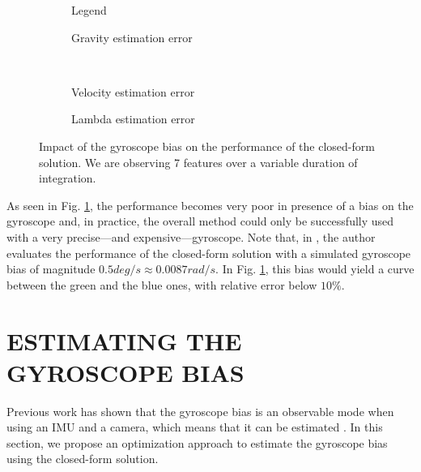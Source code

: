 \documentclass[letterpaper, 10 pt, journal, twoside]{IEEEtran}  %
\begin{document}
\begin{figure}
  \centering
        \hspace{0.2\columnwidth}%
        \begin{subfigure}[b]{0.3\columnwidth}
                \resizebox{\columnwidth}{!}{}
                \caption{Legend}

        \end{subfigure}%
        \begin{subfigure}[b]{0.5\columnwidth}
                \resizebox{\columnwidth}{!}{}
                \caption{Gravity estimation error}

        \end{subfigure}
        ~
        \begin{subfigure}[b]{0.5\columnwidth}
                \resizebox{\columnwidth}{!}{}
                \caption{Velocity estimation error}

        \end{subfigure}%
        \begin{subfigure}[b]{0.5\columnwidth}
                \resizebox{\columnwidth}{!}{}
                \caption{Lambda estimation error}

        \end{subfigure}
        \caption{Impact of the gyroscope bias on the performance of the closed-form solution. We are observing 7 features over a variable duration of integration. \label{fig:biasGyroCF}}
\end{figure}

As seen in Fig. \ref{fig:biasGyroCF}, the performance becomes very poor in presence of a bias on the gyroscope and, in practice, the overall method could only be successfully used with a very precise---and expensive---gyroscope.
Note that, in \cite{Martinelli2014}, the author evaluates the performance of the closed-form solution with a simulated gyroscope bias of magnitude $0.5deg/s \approx 0.0087 rad/s$.
In Fig. \ref{fig:biasGyroCF}, this bias would yield a curve between the green and the blue ones, with relative error below $10\%$.



\section{ESTIMATING THE GYROSCOPE BIAS}\label{SectionCalibration}

Previous work has shown that the gyroscope bias is an observable mode when using an IMU and a camera, which means that it can be estimated \cite{Martinelli2012}.
In this section, we propose an optimization approach to estimate the gyroscope bias using the closed-form solution.
\end{document}
